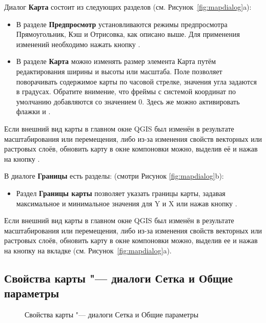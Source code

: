 
Диалог \textbf{Карта} состоит из следующих разделов
(см. Рисунок~\ref{fig:mapdialog}a):

\begin{itemize}[label=--]
\item В разделе \textbf{Предпросмотр} установливаются режимы
предпросмотра Прямоугольник, Кэш и Отрисовка, как описано выше. Для
применения изменений необходимо нажать кнопку .
\item В разделе \textbf{Карта} можно изменять размер элемента Карта
путём редактирования ширины и высоты или масштаба. Поле
 позволяет поворачивать содержимое карты
по часовой стрелке, значения угла задаются в градусах. Обратите
внимение, что фреймы с системой координат по умолчанию добавляются со
значением 0. Здесь же можно активировать флажки
 и .
\end{itemize}

Если внешний вид карты в главном окне QGIS был изменён в результате
масштабирования или перемещения, либо из-за изменения свойств векторных
или растровых слоёв, обновить карту в окне компоновки можно, выделив её
и нажав на кнопку .


В диалоге \textbf{Границы} есть разделы:
(смотри Рисунок \ref{fig:mapdialog}b):

\begin{itemize}[label=--]
\item Раздел \textbf{Границы карты} позволяет указать границы карты,
задавая максимальное и минимальное значения для Y и X или нажав кнопку
.
\end{itemize}

Если внешний вид карты в главном окне QGIS был изменён в результате
масштабирования или перемещения, либо из-за изменения свойств векторных
или растровых слоёв, обновить карту в окне компоновки можно, выделив ее
и нажав на кнопку  на вкладке  (см.
Рисунок~\ref{fig:mapdialog}a).

\subsection{Свойства карты "--- диалоги Сетка и Общие параметры}

\begin{figure}[ht]
\centering
   \hspace{1cm}
   \caption{Свойства карты "--- диалоги Сетка и Общие параметры \wincaption}\label{fig:sec_map_dialog}
\end{figure}


